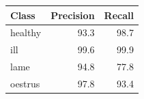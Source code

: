 \begin{tabular}{lrr}
\toprule
Class & Precision & Recall \\
\midrule
healthy & 93.3 & 98.7 \\
ill & 99.6 & 99.9 \\
lame & 94.8 & 77.8 \\
oestrus & 97.8 & 93.4 \\
\bottomrule
\end{tabular}

